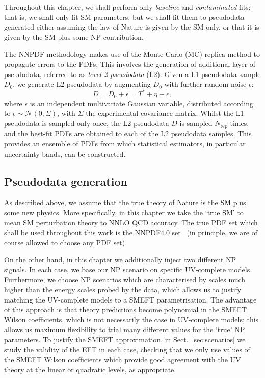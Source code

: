 \documentclass[withindex,glossary]{cam-thesis}
\begin{document}
Throughout this chapter, we shall perform only \textit{baseline} and \textit{contaminated} fits; that is, we shall only fit SM 
parameters, but we shall fit them to pseudodata generated either assuming the law of Nature is given by the SM only, 
or that it is given by the SM plus some NP contribution. 

The NNPDF methodology makes use of the Monte-Carlo (MC) replica method to propagate errors to the PDFs. 
This involves the generation of additional layer of pseudodata, referred to as \textit{level 2 pseudodata} (L2). Given a L1 pseudodata sample $D_0$, 
we generate L2 pseudodata by augmenting $D_0$ with further random noise $\epsilon$:
\begin{equation}
\label{eq:mc_pseudodata}
D = D_0 + \epsilon = T^* + \eta + \epsilon,
\end{equation}
where $\epsilon$ is an independent multivariate Gaussian variable, distributed according to $\epsilon \sim \mathcal{N}(0,\Sigma)$, with $\Sigma$ the experimental covariance matrix. Whilst the L1 pseudodata is sampled only once, the L2 pseudodata $D$ is sampled $N_{\text{rep}}$ times, and the best-fit PDFs are obtained to each of the L2 pseudodata samples. This provides an ensemble of PDFs from which statistical estimators, in particular uncertainty bands, can be constructed. 

\subsection{Pseudodata generation}
\label{subsec:pseudodata_generation}
As described above, we assume that the true theory of Nature is the SM plus some new physics. 
More specifically, in this chapter we take the `true SM' to mean SM perturbation theory to NNLO QCD accuracy. 
The true PDF set which shall be used throughout this work is the NNPDF4.0 set~\cite{Ball:2021leu} (in principle, we are of course allowed to choose any PDF set).

On the other hand, in this chapter we additionally inject two different NP signals. In each case, we base our NP scenario on specific UV-complete models. 
Furthermore, we choose NP scenarios which are characterised by scales much higher than the energy scales probed by the data, which allows us to justify matching 
the UV-complete models to a SMEFT parametrisation. The advantage of this approach is 
that theory predictions become polynomial in the SMEFT Wilson coefficients, which is not necessarily the case in UV-complete models; this allows
us maximum flexibility to trial many different values for the `true' NP parameters. To justify the SMEFT approximation, in Sect.~\ref{sec:scenarios} 
we study the validity of the EFT in each case, checking that we only use values of the SMEFT Wilson coefficients which provide good agreement with the 
UV theory at the linear or quadratic levels, as appropriate.
\end{document}
